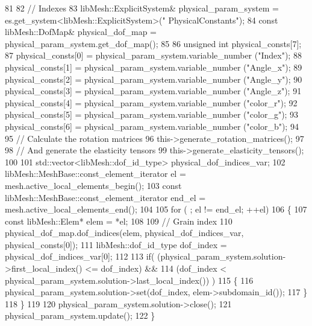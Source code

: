 \begin{DoxyCode}
81 
82     \textcolor{comment}{// Indexes}
83     libMesh::ExplicitSystem& physical\_param\_system = es.get\_system<libMesh::ExplicitSystem>(\textcolor{stringliteral}{"
      PhysicalConstants"});
84     \textcolor{keyword}{const} libMesh::DofMap& physical\_dof\_map = physical\_param\_system.get\_dof\_map();
85 
86     \textcolor{keywordtype}{unsigned} \textcolor{keywordtype}{int} physical\_consts[7];
87     physical\_consts[0] = physical\_param\_system.variable\_number (\textcolor{stringliteral}{"Index"});
88     physical\_consts[1] = physical\_param\_system.variable\_number (\textcolor{stringliteral}{"Angle\_x"});
89     physical\_consts[2] = physical\_param\_system.variable\_number (\textcolor{stringliteral}{"Angle\_y"});
90     physical\_consts[3] = physical\_param\_system.variable\_number (\textcolor{stringliteral}{"Angle\_z"});
91     physical\_consts[4] = physical\_param\_system.variable\_number (\textcolor{stringliteral}{"color\_r"});
92     physical\_consts[5] = physical\_param\_system.variable\_number (\textcolor{stringliteral}{"color\_g"});
93     physical\_consts[6] = physical\_param\_system.variable\_number (\textcolor{stringliteral}{"color\_b"});
94 
95     \textcolor{comment}{// Calculate the rotation matrices}
96     this->generate\_rotation\_matrices();
97 
98     \textcolor{comment}{// And generate the elasticity tensors}
99     this->generate\_elasticity\_tensors();
100 
101     std::vector<libMesh::dof\_id\_type> physical\_dof\_indices\_var;
102     libMesh::MeshBase::const\_element\_iterator       el     = mesh.active\_local\_elements\_begin();
103     \textcolor{keyword}{const} libMesh::MeshBase::const\_element\_iterator end\_el = mesh.active\_local\_elements\_end();
104 
105     \textcolor{keywordflow}{for} ( ; el != end\_el; ++el)
106     \{
107         \textcolor{keyword}{const} libMesh::Elem* elem = *el;
108 
109         \textcolor{comment}{// Grain index}
110         physical\_dof\_map.dof\_indices(elem, physical\_dof\_indices\_var, physical\_consts[0]);
111         libMesh::dof\_id\_type dof\_index = physical\_dof\_indices\_var[0];
112 
113         \textcolor{keywordflow}{if}( (physical\_param\_system.solution->first\_local\_index() <= dof\_index) &&
114         (dof\_index < physical\_param\_system.solution->last\_local\_index()) )
115         \{
116             physical\_param\_system.solution->set(dof\_index, elem->subdomain\_id());
117         \}
118     \}
119 
120     physical\_param\_system.solution->close();
121     physical\_param\_system.update();
122 \}
\end{DoxyCode}


